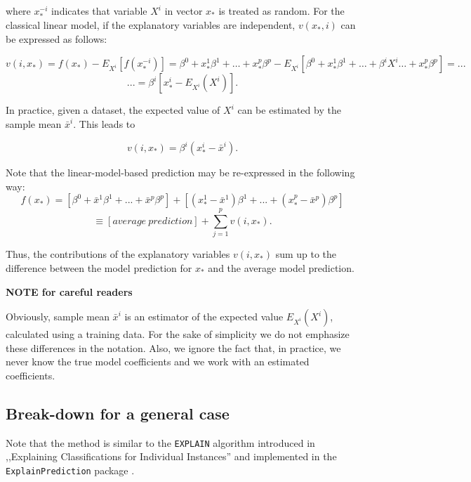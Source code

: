 \documentclass[]{krantz}
\begin{document}
where \(x^{-i}_*\) indicates that variable \(X^i\) in vector \(x_*\) is treated as random. For the classical linear model, if the explanatory variables are independent, \(v(x_*, i)\) can be expressed as follows:

\begin{equation}
v(i, x_*) = f(x_*) - E_{X^i}[f(x^{-i}_*)] = \beta^0 + x^1_* \beta^1 + \ldots + x^p_* \beta^p - E_{X^i}[\beta^0 + x^1_* \beta^1 + \ldots +\beta^i X^i \ldots + x^p_* \beta^p] = ...
\end{equation}
\begin{equation}
... = \beta^i[x_*^i - E_{X^i}(X^i)].
\end{equation}

In practice, given a dataset, the expected value of \(X^i\) can be estimated by the sample mean \(\bar x^i\). This leads to

\begin{equation}
v(i, x_*) = \beta^i (x_*^i - \bar x^i).
\end{equation}

Note that the linear-model-based prediction may be re-expressed in the following way:
\[
f(x_*) = [\beta^0 + \bar x^1 \beta^1 + ... + \bar x^p \beta^p] + [(x^1_* - \bar x^1) \beta^1 + ... + (x^p_* - \bar x^p) \beta^p] 
\]
\begin{equation}
 \equiv [average \ prediction] + \sum_{j=1}^p v(i, x_*).
\label{eq:singleBreakDownResult}
\end{equation}

Thus, the contributions of the explanatory variables \(v(i, x_*)\) sum up to the difference between the model prediction for \(x_*\) and the average model prediction.

\textbf{NOTE for careful readers}

Obviously, sample mean \(\bar x^i\) is an estimator of the expected value \(E_{X^i}(X^i)\), calculated using a training data. For the sake of simplicity we do not emphasize these differences in the notation. Also, we ignore the fact that, in practice, we never know the true model coefficients and we work with an estimated coefficients.

\hypertarget{break-down-for-a-general-case}{%
\subsection{Break-down for a general case}\label{break-down-for-a-general-case}}

Note that the method is similar to the \texttt{EXPLAIN} algorithm introduced in ,,Explaining Classifications for Individual Instances'' \citep{explainPaper} and implemented in the \texttt{ExplainPrediction} package \citep{explainPackage}.
\end{document}
